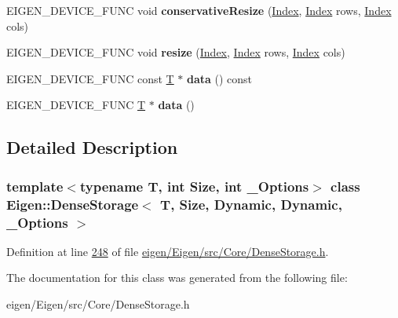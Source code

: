 \begin{DoxyCompactItemize}
E\+I\+G\+E\+N\+\_\+\+D\+E\+V\+I\+C\+E\+\_\+\+F\+U\+NC void {\bfseries conservative\+Resize} (\hyperlink{namespace_eigen_a62e77e0933482dafde8fe197d9a2cfde}{Index}, \hyperlink{namespace_eigen_a62e77e0933482dafde8fe197d9a2cfde}{Index} rows, \hyperlink{namespace_eigen_a62e77e0933482dafde8fe197d9a2cfde}{Index} cols)
\item 
\mbox{\label{class_eigen_1_1_dense_storage_3_01_t_00_01_size_00_01_dynamic_00_01_dynamic_00_01___options_01_4_acd7bb958ffd565c04bbb88653022bb79}} 
E\+I\+G\+E\+N\+\_\+\+D\+E\+V\+I\+C\+E\+\_\+\+F\+U\+NC void {\bfseries resize} (\hyperlink{namespace_eigen_a62e77e0933482dafde8fe197d9a2cfde}{Index}, \hyperlink{namespace_eigen_a62e77e0933482dafde8fe197d9a2cfde}{Index} rows, \hyperlink{namespace_eigen_a62e77e0933482dafde8fe197d9a2cfde}{Index} cols)
\item 
\mbox{\label{class_eigen_1_1_dense_storage_3_01_t_00_01_size_00_01_dynamic_00_01_dynamic_00_01___options_01_4_aa6a02a9e6a816e75e08caea69af754f7}} 
E\+I\+G\+E\+N\+\_\+\+D\+E\+V\+I\+C\+E\+\_\+\+F\+U\+NC const \hyperlink{group___sparse_core___module}{T} $\ast$ {\bfseries data} () const
\item 
\mbox{\label{class_eigen_1_1_dense_storage_3_01_t_00_01_size_00_01_dynamic_00_01_dynamic_00_01___options_01_4_a7f444f3389dcb2e310f29f06c5163bb4}} 
E\+I\+G\+E\+N\+\_\+\+D\+E\+V\+I\+C\+E\+\_\+\+F\+U\+NC \hyperlink{group___sparse_core___module}{T} $\ast$ {\bfseries data} ()
\end{DoxyCompactItemize}


\subsection{Detailed Description}
\subsubsection*{template$<$typename T, int Size, int \+\_\+\+Options$>$\newline
class Eigen\+::\+Dense\+Storage$<$ T, Size, Dynamic, Dynamic, \+\_\+\+Options $>$}



Definition at line \hyperlink{eigen_2_eigen_2src_2_core_2_dense_storage_8h_source_l00248}{248} of file \hyperlink{eigen_2_eigen_2src_2_core_2_dense_storage_8h_source}{eigen/\+Eigen/src/\+Core/\+Dense\+Storage.\+h}.



The documentation for this class was generated from the following file\+:\begin{DoxyCompactItemize}
\item 
eigen/\+Eigen/src/\+Core/\+Dense\+Storage.\+h\end{DoxyCompactItemize}
